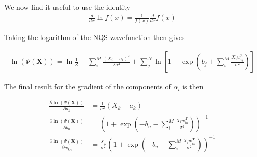 \noindent We now find it useful to use the identity 
\begin{align}
    \frac{d}{dx}\ln f(x) = \frac{1}{f(x)} \frac{d}{dx}f(x)
\end{align}

\noindent Taking the logarithm of the NQS wavefunction then gives

\begin{align}
    \ln( \Psi(\mathbf{X}) )  = \ln{\frac{1}{Z}} -\sum_i^M \frac{(X_i - a_i)^2}{2\sigma^2} 
    + \sum_j^N \ln\left[  1 + \exp\left(b_j  + \sum_i^M \frac{X_i w^\mathbf{T}_{ij}}{\sigma^2}\right) \right]
\end{align}

\noindent  The final result for the gradient of the components of $\alpha_i$ is then  

\begin{align}
    \frac{\partial \ln( \Psi(\mathbf{X}) )}{\partial a_k} &= \frac{1}{\sigma ^2} (X_k - a_k)\\
    \frac{\partial \ln( \Psi(\mathbf{X}) )}{\partial b_n} &= \left(1 +  \exp\left(- b_n  - \sum_i^M \frac{X_i w^\mathbf{T}_{in}}{\sigma^2}\right)  \right)^{-1}  \\
    \frac{\partial \ln( \Psi(\mathbf{X}) )}{\partial w_{kn}}& = \frac{X_k}{\sigma^2} \left(1 +  \exp\left(- b_n  - \sum_i^M \frac{X_i w^\mathbf{T}_{in}}{\sigma^2}\right)  \right)^{-1}   
\end{align}
